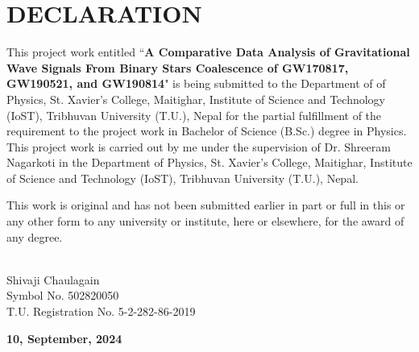 \chapter*{DECLARATION}
This project work entitled ``\textbf{A Comparative Data Analysis of Gravitational Wave Signals From Binary Stars Coalescence of GW170817, GW190521, and GW190814}" is being submitted to the Department of of Physics, St. Xavier's College, Maitighar, Institute of Science and Technology
(IoST), Tribhuvan University (T.U.), Nepal for the partial fulfillment of the requirement to the project
work in Bachelor of Science (B.Sc.) degree in Physics. This project work is carried out by me under the supervision of Dr. Shreeram Nagarkoti in the Department of Physics, St. Xavier's College, Maitighar, Institute of Science and Technology (IoST), Tribhuvan University (T.U.), Nepal.
\vspace{8pt}

\noindent This work is original and has not been submitted earlier in part or full in this or any other form to any university or institute, here or elsewhere, for the award of any degree.

\vspace{70pt}
\begin{flushright}
	\underline{\hspace{3cm}} \\
	Shivaji Chaulagain\\
	Symbol No. 502820050\\
	T.U. Registration No. 5-2-282-86-2019 \\
\end{flushright}


\vspace{80pt}
\begin{center}
{\fontsize{16}{12}\selectfont \textbf{10, September, 2024}}
\end{center}